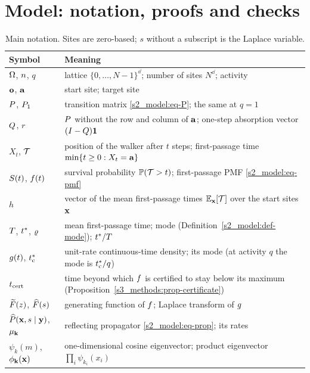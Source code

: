 \section{Model: notation, proofs and checks}\label{sup_model:sec}

\begin{table}[htb]
\centering
\caption{Main notation. Sites are zero-based; $s$ without a subscript is the Laplace variable.}
\label{s2_model:tab-notation}
\small
\begin{tabular}{@{}ll@{}}
\toprule
Symbol & Meaning \\
\midrule
$\Omega$, $n$, $q$ & lattice $\{0,\dots,N-1\}^{\dd}$; number of sites $N^{\dd}$; activity \\
$\mathbf{o}$, $\mathbf{a}$ & start site; target site \\
$P$, $P_1$ & transition matrix \eqref{s2_model:eq-P}; the same at $q=1$ \\
$Q$, $r$ & $P$ without the row and column of $\mathbf{a}$; one-step absorption vector $(I-Q)\mathbf{1}$ \\
$X_t$, $\mathcal{T}$ & position of the walker after $t$ steps; first-passage time $\min\{t\ge0:X_t=\mathbf{a}\}$ \\
$S(t)$, $f(t)$ & survival probability $\mathbb{P}(\mathcal{T}>t)$; first-passage PMF \eqref{s2_model:eq-pmf} \\
$h$ & vector of the mean first-passage times $\mathbb{E}_{\mathbf{x}}[\mathcal{T}]$ over the start sites $\mathbf{x}$ \\
$T$, $t^{*}$, $\varrho$ & mean first-passage time; mode (Definition~\ref{s2_model:def-mode}); $t^{*}/T$ \\
$g(t)$, $t^{*}_{\mathrm{c}}$ & unit-rate continuous-time density; its mode (at activity $q$ the mode is $t^{*}_{\mathrm{c}}/q$) \\
$t_{\mathrm{cert}}$ & time beyond which $f$ is certified to stay below its maximum (Proposition~\ref{s3_methods:prop-certificate}) \\
$\widetilde{F}(z)$, $\widehat{F}(s)$ & generating function of $f$; Laplace transform of $g$ \\
$\widehat{P}(\mathbf{x},s\mid\mathbf{y})$, $\mu_{\mathbf{k}}$ & reflecting propagator \eqref{s2_model:eq-prop}; its rates \\
$\psi_{k}(m)$, $\phi_{\mathbf{k}}(\mathbf{x})$ & one-dimensional cosine eigenvector; product eigenvector $\prod_i\psi_{k_i}(x_i)$ \\

\end{tabular}
\end{table}
